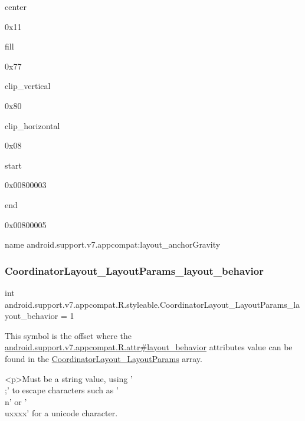 {\ttfamily center}

0x11

{\ttfamily fill}

0x77

{\ttfamily clip\+\_\+vertical}

0x80

{\ttfamily clip\+\_\+horizontal}

0x08

{\ttfamily start}

0x00800003

{\ttfamily end}

0x00800005

name android.\+support.\+v7.\+appcompat\+:layout\+\_\+anchor\+Gravity \mbox{\label{classandroid_1_1support_1_1v7_1_1appcompat_1_1R_1_1styleable_a3c5485968079da7140d1094aeaed49d7}} 
\subsubsection{\texorpdfstring{Coordinator\+Layout\+\_\+\+Layout\+Params\+\_\+layout\+\_\+behavior}{CoordinatorLayout\_LayoutParams\_layout\_behavior}}
{\footnotesize\ttfamily int android.\+support.\+v7.\+appcompat.\+R.\+styleable.\+Coordinator\+Layout\+\_\+\+Layout\+Params\+\_\+layout\+\_\+behavior = 1\hspace{0.3cm}{\ttfamily [static]}}

This symbol is the offset where the \hyperlink{classandroid_1_1support_1_1v7_1_1appcompat_1_1R_1_1attr_a00932b370ca0c3682e18c8d9ab07da5b}{android.\+support.\+v7.\+appcompat.\+R.\+attr\#layout\+\_\+behavior} attribute\textquotesingle{}s value can be found in the \hyperlink{classandroid_1_1support_1_1v7_1_1appcompat_1_1R_1_1styleable_aa327c121de57ab2e57c054fff5f5c980}{Coordinator\+Layout\+\_\+\+Layout\+Params} array.

\begin{DoxyVerb}      <p>Must be a string value, using '\\;' to escape characters such as '\\n' or '\\uxxxx' for a unicode character.
\end{DoxyVerb}
 

